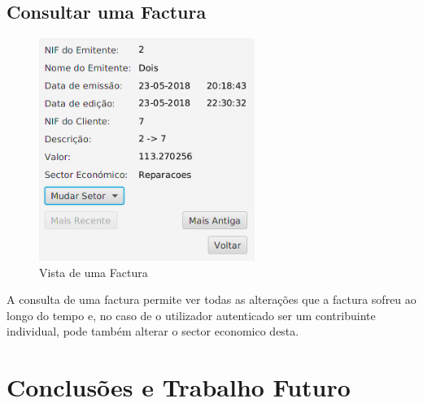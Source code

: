 \documentclass[12pt,a4paper]{report}
\begin{document}
    \section{Consultar uma Factura}
    \label{sec:viewFactura}
\begin{figure}
    \centering
    \includegraphics[width=7cm]{./images/facturaView.png}
    \caption{Vista de uma Factura}
    \label{fig:viewFactura}
\end{figure}
    A consulta de uma factura permite ver todas as alterações que a factura
    sofreu ao longo do tempo e, no caso de o utilizador autenticado ser
    um contribuinte individual, pode também alterar o sector economico desta.

\chapter{Conclusões e Trabalho Futuro}
\end{document}
